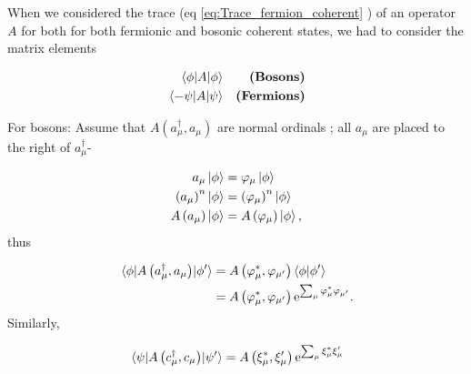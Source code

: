 When we considered the trace (eq \eqref{eq:Trace_fermion_coherent} ) of an operator \(A\) for both for both fermionic and bosonic coherent states, we had to consider the matrix elements

\begin{align*}
	\mel{\phi}{A}{\phi} && \textbf{(Bosons)}\\
	\mel{-\psi}{A}{\psi} && \textbf{(Fermions)} 
\end{align*}

For bosons: Assume that \(A(a_\mu^\dagger, a_\mu)\) are normal ordinals \label{unc:ordinals}; all \(a_\mu\) are placed to the right of \(a_\mu^\dagger\)-

\begin{align}
a_\mu\ket\phi &= \varphi_\mu\ket\phi \\
\left(a_\mu\right)^n\ket\phi &= \left(\varphi_\mu\right)^n\ket\phi \\
A\left(a_\mu\right)\ket\phi &= A\left(\varphi_\mu\right)\ket\phi,
\end{align}
thus

\begin{align}
\mel{\phi}{A\left( a_\mu^\dagger, a_\mu\right)}{\phi'}
&= A\left(\varphi_\mu^*, \varphi_{\mu'}\right)\braket{\phi}{\phi'} \\
&= A\left(\varphi_\mu^*, \varphi_{\mu'}\right)\mathrm{e}^{\sum_\mu\varphi_\mu^*\varphi_{\mu'}}. 
\end{align}
Similarly, 

\begin{equation}
\mel{\psi}{A\left( c_\mu^\dagger,c_\mu\right)}{\psi'} = A\left(\xi_\mu^*,\xi_\mu'\right)\mathrm{e}^{\sum_\mu\xi_\mu^*\xi_\mu'}
\end{equation}